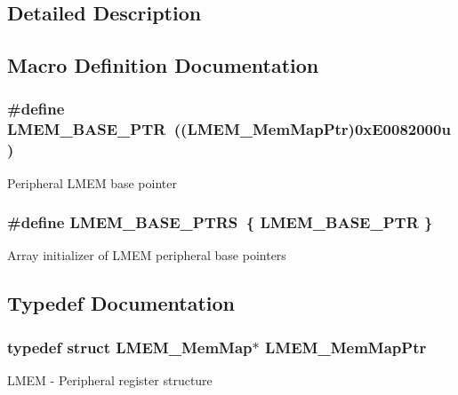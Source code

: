 \subsection{Detailed Description}


\subsection{Macro Definition Documentation}
\hypertarget{group___l_m_e_m___peripheral_ga1666dc97b6d56a81369b43b1ee4ae240}{}
\subsubsection[{L\+M\+E\+M\+\_\+\+B\+A\+S\+E\+\_\+\+P\+T\+R}]{\setlength{\rightskip}{0pt plus 5cm}\#define L\+M\+E\+M\+\_\+\+B\+A\+S\+E\+\_\+\+P\+T\+R~(({\bf L\+M\+E\+M\+\_\+\+Mem\+Map\+Ptr})0x\+E0082000u)}\label{group___l_m_e_m___peripheral_ga1666dc97b6d56a81369b43b1ee4ae240}
Peripheral L\+M\+E\+M base pointer \hypertarget{group___l_m_e_m___peripheral_ga3b8cec218a8a57a762a94905faf149b4}{}
\subsubsection[{L\+M\+E\+M\+\_\+\+B\+A\+S\+E\+\_\+\+P\+T\+R\+S}]{\setlength{\rightskip}{0pt plus 5cm}\#define L\+M\+E\+M\+\_\+\+B\+A\+S\+E\+\_\+\+P\+T\+R\+S~\{ {\bf L\+M\+E\+M\+\_\+\+B\+A\+S\+E\+\_\+\+P\+T\+R} \}}\label{group___l_m_e_m___peripheral_ga3b8cec218a8a57a762a94905faf149b4}
Array initializer of L\+M\+E\+M peripheral base pointers 

\subsection{Typedef Documentation}
\hypertarget{group___l_m_e_m___peripheral_gad8e02e2903502eea2a0cc497a0dde6d8}{}
\subsubsection[{L\+M\+E\+M\+\_\+\+Mem\+Map\+Ptr}]{\setlength{\rightskip}{0pt plus 5cm}typedef struct {\bf L\+M\+E\+M\+\_\+\+Mem\+Map}$\ast$ {\bf L\+M\+E\+M\+\_\+\+Mem\+Map\+Ptr}}\label{group___l_m_e_m___peripheral_gad8e02e2903502eea2a0cc497a0dde6d8}
L\+M\+E\+M -\/ Peripheral register structure 